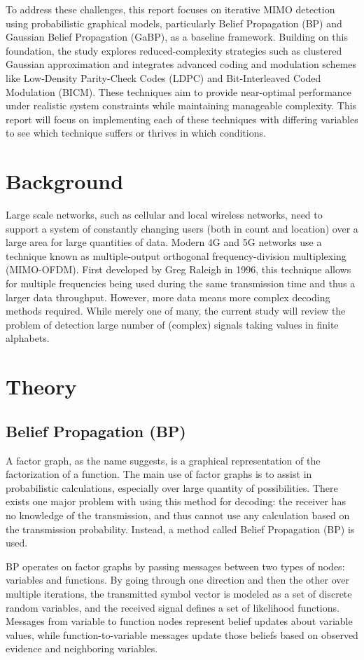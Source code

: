 \documentclass[conference]{IEEEtran}
\begin{document}
To address these challenges, this report focuses on iterative MIMO detection using probabilistic graphical models, particularly Belief Propagation (BP) and Gaussian Belief Propagation (GaBP), as a baseline framework. Building on this foundation, the study explores reduced-complexity strategies such as clustered Gaussian approximation and integrates advanced coding and modulation schemes like Low-Density Parity-Check Codes (LDPC) and Bit-Interleaved Coded Modulation (BICM). These techniques aim to provide near-optimal performance under realistic system constraints while maintaining manageable complexity. This report will focus on implementing each of these techniques with differing variables to see which technique suffers or thrives in which conditions.

\section{Background}
Large scale networks, such as cellular and local wireless networks, need to support a system of constantly changing users (both in count and location) over a large area for large quantities of data. Modern 4G and 5G networks use a technique known as multiple-output orthogonal frequency-division multiplexing (MIMO-OFDM). First developed by Greg Raleigh in 1996, this technique allows for multiple frequencies being used during the same transmission time and thus a larger data throughput. \cite{OriginOfMIMOOFDM} However, more data means more complex decoding methods required. While merely one of many, the current study will review the problem of detection large number of (complex) signals taking values in finite alphabets.

\section{Theory}
\subsection{Belief Propagation (BP)}
A factor graph, as the name suggests, is a graphical representation of the factorization of a function. The main use of factor graphs is to assist in probabilistic calculations, especially over large quantity of possibilities. There exists one major problem with using this method for decoding: the receiver has no knowledge of the transmission, and thus cannot use any calculation based on the transmission probability. Instead, a method called Belief Propagation (BP) is used.\par
BP operates on factor graphs by passing messages between two types of nodes: variables and functions. By going through one direction and then the other over multiple iterations, the transmitted symbol vector is modeled as a set of discrete random variables, and the received signal defines a set of likelihood functions. Messages from variable to function nodes represent belief updates about variable values, while function-to-variable messages update those beliefs based on observed evidence and neighboring variables.
\end{document}
